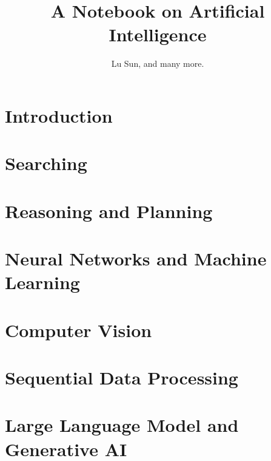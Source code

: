 



\makeindex



\frontmatter

\title{A Notebook on Artificial Intelligence}
\author{Lu Sun, and many more.}

\maketitle


\tableofcontents


\listoffigures
\listoftables

\mainmatter

\part{Introduction}

\part{Searching}

\part{Reasoning and Planning}

\part{Neural Networks and Machine Learning}







\part{Computer Vision}



\part{Sequential Data Processing}



\part{Large Language Model and Generative AI}








\printindex


